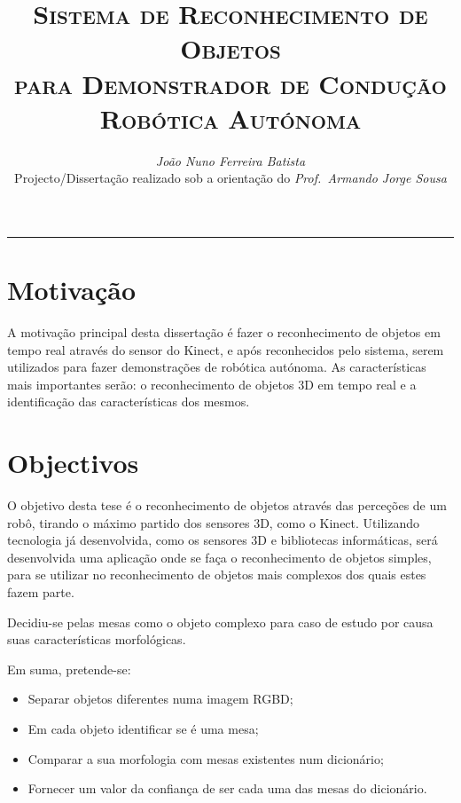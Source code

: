 \documentclass[9pt,a4paper]{extarticle}
\begin{document}
\title{\vspace*{-8mm}\textbf{\textsc{Sistema de Reconhecimento de Objetos\\
para Demonstrador de Condução Robótica Autónoma}}}
\author{\emph{João Nuno Ferreira Batista}\\[2mm]
\small{Projecto/Dissertação realizado sob a orientação do \emph{Prof.\ Armando Jorge Sousa}}}
\date{}
\maketitle
\thispagestyle{empty}

\vspace*{-4mm}\noindent\rule{\textwidth}{0.4pt}\vspace*{4mm}

\begin{multicols}{2}

\section{Motivação}\label{sec:motiva}

A motivação principal desta dissertação é fazer o reconhecimento de objetos em tempo real através do sensor do Kinect, e após reconhecidos pelo sistema, serem utilizados para fazer demonstrações de robótica autónoma. As características mais importantes serão: o reconhecimento de objetos 3D em tempo real e a identificação das características dos mesmos.

\section{Objectivos}\label{sec:goals}

O objetivo desta tese é o reconhecimento de objetos através das perceções de um robô, tirando o máximo partido dos sensores 3D, como o Kinect. Utilizando tecnologia já desenvolvida, como os sensores 3D e bibliotecas informáticas, será desenvolvida uma aplicação onde se faça o reconhecimento de objetos simples, para se utilizar no reconhecimento de objetos mais complexos dos quais estes fazem parte.

Decidiu-se pelas mesas como o objeto complexo para caso de estudo por causa suas características morfológicas.

Em suma, pretende-se:
\begin{itemize}
\item Separar objetos diferentes numa imagem RGBD; 
\item Em cada objeto identificar se é uma mesa;
\item Comparar a sua morfologia com mesas existentes num dicionário;
\item Fornecer um valor da confiança de ser cada uma das mesas do dicionário.
\end{itemize}


\end{multicols}
\end{document}
